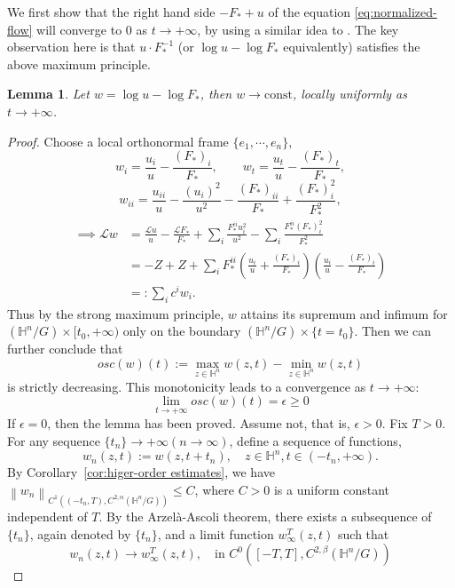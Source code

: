 \documentclass[10pt,a4paper]{amsart}
\newtheorem{lemma}[theorem]{Lemma}
\newcommand{\norm}[1]{\left\lVert{#1}\right\rVert}
\renewcommand{\H}{{\mathbb{H}}}
\numberwithin{equation}{section}
\begin{document}
We first show that the right hand side \( -F_* + u\) of the equation \eqref{eq:normalized-flow} will converge to \(0\) as \(t\to +\infty\), by using a similar idea to \cite{Huang2021}. The key observation here is that \(u\cdot F_*^{-1}\) (or \(\log u - \log F_*\) equivalently) satisfies the above maximum principle. 
\begin{lemma}\label{lem:logu-logF}
    Let \(w = \log u - \log F_*\), then \(w \to \text{const}\), locally uniformly as \(t\to +\infty\). 
\end{lemma}
\begin{proof}
    Choose a local orthonormal frame \(\{e_1,\cdots,e_n\}\), 
    \[ w_i = \frac{u_i}{u} - \frac{(F_*)_i}{F_*}, \qquad w_t = \frac{u_t}{u} - \frac{(F_*)_t}{F_*}, \]
    \[ w_{ii} = \frac{u_{ii}}{u} - \frac{(u_i)^2}{u^2} - \frac{(F_*)_{ii}}{F_*} + \frac{(F_*)_i^2}{F_*^2}, \]
    \begin{equation}\label{eq:eq-for-w}
        \begin{aligned}
        \implies  \mathscr{L}w &= \frac{\mathscr{L}u}{u} -\frac{\mathscr{L}{F_*}}{F_*} + \sum_i \frac{F_*^{ii}u_i^2}{u^2} - \sum_i \frac{F_*^{ii}(F_*)_i^2}{F_*^2}\\
        &= -Z + Z + \sum_i F_*^{ii} \left( \frac{u_i}{u} +\frac{(F_*)_i}{F_*}\right) \left( \frac{u_i}{u} - \frac{(F_*)_i}{F_*} \right) \\
        &=: \sum_i c^i w_i.
        \end{aligned} 
    \end{equation}
    Thus by the strong maximum principle, \(w\) attains its supremum and infimum for \((\H^n / G) \times [t_0,+\infty)\) only on the boundary \((\H^n / G) \times \{t=t_0\}\). Then we can further conclude that 
    \[ osc(w)(t) := \max_{z\in \H^n}w(z,t) - \min_{z\in \H^n}w(z,t) \]
    is strictly decreasing. This monotonicity leads to a convergence as \(t\to +\infty\):
    \[ \lim_{t\to +\infty} osc(w)(t) = \epsilon \geq 0 \]
    If \(\epsilon = 0\), then the lemma has been proved. Assume not, that is, \(\epsilon > 0\). Fix \(T > 0\). For any sequence \(\{t_n\}\to +\infty (n\to \infty)\), define a sequence of functions,  
    \[ w_n(z,t) := w(z,t+t_n), \quad z\in \H^n, t\in (-t_n,+\infty). \]
    By Corollary~\ref{cor:higer-order estimates}, we have 
    \(\norm{w_n}_{C^1((-t_n,T), C^{2,\alpha}(\H^n / G))}\leq C\), where \(C>0\) is a uniform constant independent of \(T\). By the Arzelà-Ascoli theorem, there exists a subsequence of \(\{t_n\}\), again denoted by \(\{t_n\}\), and a limit function \(w_{\infty}^{T}(z,t)\) such that 
    \[ w_n(z,t) \to w_{\infty}^{T}(z,t), \quad \text{in }C^0\left([-T,T],C^{2,\beta}(\H^n / G)\right) \]

\end{proof}
\end{document}
